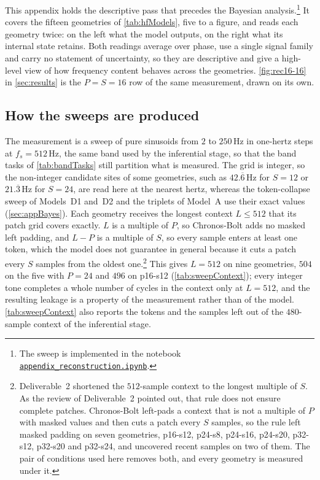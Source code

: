This appendix holds the descriptive pass that precedes the Bayesian analysis.\footnote{The sweep is implemented in the notebook \href{https://github.com/FedericoSabbadini/patchAliasing/blob/main/notebooks/signal_analysis/appendix_reconstruction.ipynb}{\texttt{appendix\_reconstruction.ipynb}}.} It covers the fifteen geometries of \autoref{tab:hfModels}, five to a figure, and reads each geometry twice: on the left what the model outputs, on the right what its internal state retains. Both readings average over phase, use a single signal family and carry no statement of uncertainty, so they are descriptive and give a high-level view of how frequency content behaves across the geometries\@. \autoref{fig:rec16-16} in \autoref{sec:results} is the $P=S=16$ row of the same measurement, drawn on its own.

\subsection{How the sweeps are produced}

The measurement is a sweep of pure sinusoids from $2$ to $250$\,Hz in one-hertz steps at $f_s=512$\,Hz, the same band used by the inferential stage, so that the band tasks of \autoref{tab:bandTasks} still partition what is measured. The grid is integer, so the non-integer candidate sites of some geometries, such as $42.\overline{6}$\,Hz for $S=12$ or $21.\overline{3}$\,Hz for $S=24$, are read here at the nearest hertz, whereas the token-collapse sweep of Models~D1 and~D2 and the triplets of Model~A use their exact values (\autoref{sec:appBayes}). Each geometry receives the longest context $L\le512$ that its patch grid covers exactly. $L$ is a multiple of $P$, so Chronos-Bolt adds no masked left padding, and $L-P$ is a multiple of $S$, so every sample enters at least one token, which the model does not guarantee in general because it cuts a patch every $S$ samples from the oldest one.\footnote{Deliverable~2 shortened the $512$-sample context to the longest multiple of $S$. As the review of Deliverable~2 pointed out, that rule does not ensure complete patches. Chronos-Bolt left-pads a context that is not a multiple of $P$ with masked values and then cuts a patch every $S$ samples, so the rule left masked padding on seven geometries, p16-s12, p24-s8, p24-s16, p24-s20, p32-s12, p32-s20 and p32-s24, and uncovered recent samples on two of them. The pair of conditions used here removes both, and every geometry is measured under it.} This gives $L=512$ on nine geometries, $504$ on the five with $P=24$ and $496$ on p16-s12 (\autoref{tab:sweepContext}); every integer tone completes a whole number of cycles in the context only at $L=512$, and the resulting leakage is a property of the measurement rather than of the model\@. \autoref{tab:sweepContext} also reports the tokens and the samples left out of the $480$-sample context of the inferential stage.

